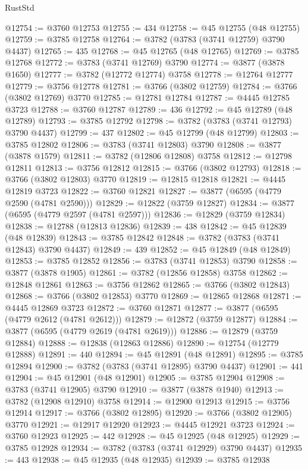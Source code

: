 \begin{lexlean}{RustStd}
\begin{coremodule}
@12754 := @3760 @12753
@12755 := 434
@12758 := @45 @12755 (@48 @12755)
@12759 := @3785 @12758
@12764 := @3782 (@3783 (@3741 @12759) @3790 @4437)
@12765 := 435
@12768 := @45 @12765 (@48 @12765)
@12769 := @3785 @12768
@12772 := @3783 (@3741 @12769) @3790
@12774 := @3877 (@3878 @1650)
@12777 := @3782 (@12772 @12774) @3758
@12778 := @12764 @12777
@12779 := @3756 @12778
@12781 := @3766 (@3802 @12759)
@12784 := @3766 (@3802 @12769) @3770
@12785 := @12781 @12784
@12787 := @4445 @12785 @3723
@12788 := @3760 @12787
@12789 := 436
@12792 := @45 @12789 (@48 @12789)
@12793 := @3785 @12792
@12798 := @3782 (@3783 (@3741 @12793) @3790 @4437)
@12799 := 437
@12802 := @45 @12799 (@48 @12799)
@12803 := @3785 @12802
@12806 := @3783 (@3741 @12803) @3790
@12808 := @3877 (@3878 @1579)
@12811 := @3782 (@12806 @12808) @3758
@12812 := @12798 @12811
@12813 := @3756 @12812
@12815 := @3766 (@3802 @12793)
@12818 := @3766 (@3802 @12803) @3770
@12819 := @12815 @12818
@12821 := @4445 @12819 @3723
@12822 := @3760 @12821
@12827 := @3877 (@6595 (@4779 @2590 (@4781 @2590)))
@12829 := @12822 (@3759 @12827)
@12834 := @3877 (@6595 (@4779 @2597 (@4781 @2597)))
@12836 := @12829 (@3759 @12834)
@12838 := @12788 (@12813 @12836)
@12839 := 438
@12842 := @45 @12839 (@48 @12839)
@12843 := @3785 @12842
@12848 := @3782 (@3783 (@3741 @12843) @3790 @4437)
@12849 := 439
@12852 := @45 @12849 (@48 @12849)
@12853 := @3785 @12852
@12856 := @3783 (@3741 @12853) @3790
@12858 := @3877 (@3878 @1905)
@12861 := @3782 (@12856 @12858) @3758
@12862 := @12848 @12861
@12863 := @3756 @12862
@12865 := @3766 (@3802 @12843)
@12868 := @3766 (@3802 @12853) @3770
@12869 := @12865 @12868
@12871 := @4445 @12869 @3723
@12872 := @3760 @12871
@12877 := @3877 (@6595 (@4779 @2612 (@4781 @2612)))
@12879 := @12872 (@3759 @12877)
@12884 := @3877 (@6595 (@4779 @2619 (@4781 @2619)))
@12886 := @12879 (@3759 @12884)
@12888 := @12838 (@12863 @12886)
@12890 := @12754 (@12779 @12888)
@12891 := 440
@12894 := @45 @12891 (@48 @12891)
@12895 := @3785 @12894
@12900 := @3782 (@3783 (@3741 @12895) @3790 @4437)
@12901 := 441
@12904 := @45 @12901 (@48 @12901)
@12905 := @3785 @12904
@12908 := @3783 (@3741 @12905) @3790
@12910 := @3877 (@3878 @1940)
@12913 := @3782 (@12908 @12910) @3758
@12914 := @12900 @12913
@12915 := @3756 @12914
@12917 := @3766 (@3802 @12895)
@12920 := @3766 (@3802 @12905) @3770
@12921 := @12917 @12920
@12923 := @4445 @12921 @3723
@12924 := @3760 @12923
@12925 := 442
@12928 := @45 @12925 (@48 @12925)
@12929 := @3785 @12928
@12934 := @3782 (@3783 (@3741 @12929) @3790 @4437)
@12935 := 443
@12938 := @45 @12935 (@48 @12935)
@12939 := @3785 @12938

\end{coremodule}
\end{lexlean}
